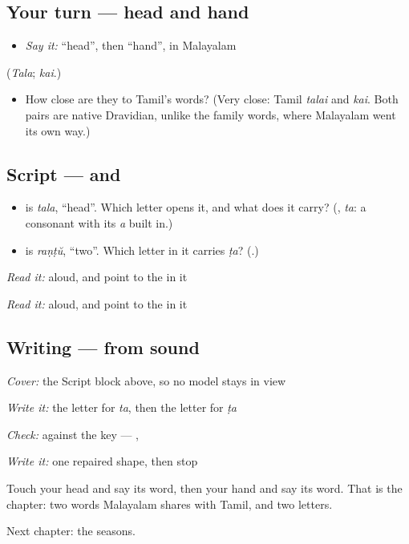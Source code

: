 \subsection*{Your turn — head and hand}
\begin{itemize}
\raggedright
  \item \emph{Say it:} \textquotedblleft{}head\textquotedblright{}, then \textquotedblleft{}hand\textquotedblright{}, in Malayalam
\end{itemize}

(\emph{Tala}; \emph{kai}.)

\begin{itemize}
\raggedright
  \item How close are they to Tamil's words? (Very close: Tamil \emph{talai} and \emph{kai}. Both pairs are native Dravidian, unlike the family words, where Malayalam went its own way.)
\end{itemize}

\subsection*{Script —  and }
\begin{itemize}
\raggedright
  \item \textbf{} is \emph{tala}, \textquotedblleft{}head\textquotedblright{}. Which letter opens it, and what does it carry? (\textbf{}, \emph{ta}: a consonant with its \emph{a} built in.)
  \item \textbf{} is \emph{raṇṭŭ}, \textquotedblleft{}two\textquotedblright{}. Which letter in it carries \emph{ṭa}? (\textbf{}.)
\end{itemize}

\emph{Read it:} \textbf{} aloud, and point to the  in it

\emph{Read it:} \textbf{} aloud, and point to the  in it

\subsection*{Writing — from sound}
\emph{Cover:} the Script block above, so no model stays in view

\emph{Write it:} the letter for \emph{ta}, then the letter for \emph{ṭa}

\emph{Check:} against the key — \textbf{}, \textbf{}

\emph{Write it:} one repaired shape, then stop

\begin{tcolorbox}[breakable,colback=teal!4,colframe=teal!35!black,title={Before you move on}]
Touch your head and say its word, then your hand and say its word. That is the chapter: two words Malayalam shares with Tamil, and two letters.

Next chapter: the seasons.
\end{tcolorbox}
